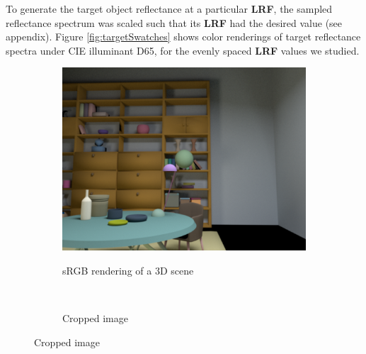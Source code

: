 \documentclass{jov}
\providecommand{\DIFaddtex}[1]{{\bf #1}} %
\providecommand{\DIFdeltex}[1]{} %
\providecommand{\DIFaddbegin}{} %
\providecommand{\DIFaddend}{} %
\providecommand{\DIFdelbegin}{} %
\providecommand{\DIFdelend}{} %
\providecommand{\DIFadd}[1]{\texorpdfstring{\DIFaddtex{#1}}{#1}} %
\providecommand{\DIFdel}[1]{\texorpdfstring{\DIFdeltex{#1}}{}} %
\newcommand{\DIFscaledelfig}{0.5}
\newlength{\DIFdelgraphicswidth} %
\newlength{\DIFdelgraphicsheight} %
\newcommand{\DIFaddincludegraphics}[2][]{{\color{blue}\fbox{\DIFOincludegraphics[#1]{#2}}}} %
\newcommand{\DIFdelincludegraphics}[2][]{%
\sbox{\DIFdelgraphicsbox}{\DIFOincludegraphics[#1]{#2}}%
\settoboxwidth{\DIFdelgraphicswidth}{\DIFdelgraphicsbox} %
\settoboxtotalheight{\DIFdelgraphicsheight}{\DIFdelgraphicsbox} %
\scalebox{\DIFscaledelfig}{%
\parbox[b]{\DIFdelgraphicswidth}{\usebox{\DIFdelgraphicsbox}\\[-\baselineskip] \rule{\DIFdelgraphicswidth}{0em}}\llap{\resizebox{\DIFdelgraphicswidth}{\DIFdelgraphicsheight}{%
\setlength{\unitlength}{\DIFdelgraphicswidth}%
\begin{picture}(1,1)%
\thicklines\linethickness{2pt} %
{\color[rgb]{1,0,0}\put(0,0){\framebox(1,1){}}}%
{\color[rgb]{1,0,0}\put(0,0){\line( 1,1){1}}}%
{\color[rgb]{1,0,0}\put(0,1){\line(1,-1){1}}}%
\end{picture}%
}\hspace*{3pt}}} %
} %
\DeclareRobustCommand{\DIFaddbegin}{\DIFOaddbegin \let\includegraphics\DIFaddincludegraphics} %
\DeclareRobustCommand{\DIFaddend}{\DIFOaddend \let\includegraphics\DIFOincludegraphics} %
\DeclareRobustCommand{\DIFdelbegin}{\DIFOdelbegin \let\includegraphics\DIFdelincludegraphics} %
\DeclareRobustCommand{\DIFdelend}{\DIFOaddend \let\includegraphics\DIFOincludegraphics} %
\begin{document}
To generate the target object reflectance at a particular \DIFdelbegin \DIFdel{LRV}\DIFdelend \DIFaddbegin \DIFadd{LRF}\DIFaddend , the sampled reflectance spectrum was 
scaled such that its \DIFdelbegin \DIFdel{LRV }\DIFdelend \DIFaddbegin \DIFadd{LRF }\DIFaddend had the desired value (see appendix).
Figure \ref{fig:targetSwatches} shows color renderings of target reflectance spectra under CIE illuminant D65, for the evenly spaced \DIFdelbegin \DIFdel{LRV }\DIFdelend \DIFaddbegin \DIFadd{LRF }\DIFaddend values we studied.

\begin{figure}
\centering
\begin{subfigure}[b]{0.25 \textwidth}
		\centering
        \caption{sRGB rendering of a 3D scene}
                \vspace{1.2mm}
        \includegraphics[width=\textwidth]{../FiguresDraft5/Figure9/Figure9_a.png}
        \label{fig:3DScene}
    \end{subfigure}
    ~ 
    \begin{subfigure}[b]{0.19 \textwidth}   
    \hspace{0.1 \textwidth}
        \caption{Cropped image}
        \vspace{2.5mm}

\end{subfigure}
\end{figure}
\end{document}
